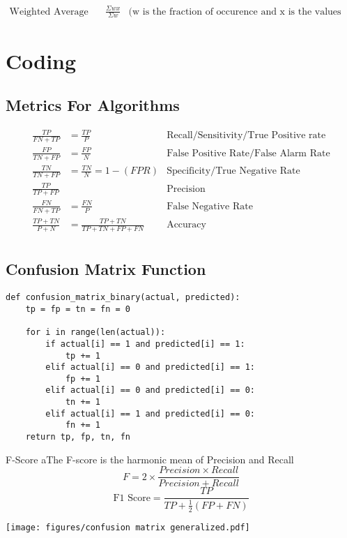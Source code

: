 \documentclass{report}
\begin{document}
\begin{align*}
	\text{Weighted Average = } &\frac{\Sigma w x}{\Sigma w} &\text{(w is the fraction of occurence and x is the values given.)}
\end{align*}
\chapter{Coding}
\lstset{language=Python}
\section{Metrics For Algorithms}
\begin{align*}
	\frac{TP}{FN+TP} &= \frac{TP}{P} &\text{Recall/Sensitivity/True Positive rate} \\
	\frac{FP}{TN+FP} &= \frac{FP}{N} &\text{False Positive Rate/False Alarm Rate} \\
	\frac{TN}{TN+FP} &= \frac{TN}{N} = 1 - (FPR) &\text{Specificity/True Negative Rate} \\
	\frac{TP}{TP+FP} & &\text{Precision} \\
	\frac{FN}{FN+TP} &= \frac{FN}{P} &\text{False Negative Rate} \\
	\frac{TP + TN}{P+N} &= \frac{TP+TN}{TP+TN+FP+FN} &\text{Accuracy} \\
\end{align*}
\section{Confusion Matrix Function}
\begin{lstlisting}
def confusion_matrix_binary(actual, predicted):
    tp = fp = tn = fn = 0

    for i in range(len(actual)):
        if actual[i] == 1 and predicted[i] == 1:
            tp += 1
        elif actual[i] == 0 and predicted[i] == 1:
            fp += 1  
        elif actual[i] == 0 and predicted[i] == 0:
            tn += 1  
        elif actual[i] == 1 and predicted[i] == 0:
            fn += 1 
    return tp, fp, tn, fn
\end{lstlisting}
\begin{definition}{F-Score}
	aThe F-score is the harmonic mean of Precision and Recall
	\[
		F = 2 \times \frac{Precision \times Recall}{Precision + Recall}
	\]
	\[
		\text{F1 Score} = \frac{TP}{TP+ \frac{1}{2}(FP+FN)}
	\]
\end{definition}

\texttt{[image: figures/confusion matrix generalized.pdf]}
 
\end{document}
